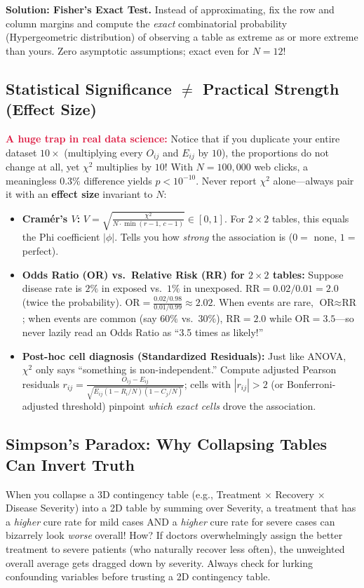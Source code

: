 \documentclass[11pt, a4paper]{article}
\begin{document}
\textbf{Solution: Fisher's Exact Test.} Instead of approximating, fix the row and column margins and compute the \emph{exact} combinatorial probability (Hypergeometric distribution) of observing a table as extreme as or more extreme than yours. Zero asymptotic assumptions; exact even for $N = 12$!

\subsection{Statistical Significance $\neq$ Practical Strength (Effect Size)}
\textcolor{crimson}{\textbf{A huge trap in real data science:}} Notice that if you duplicate your entire dataset $10\times$ (multiplying every $O_{ij}$ and $E_{ij}$ by $10$), the proportions do not change at all, yet $\chi^2$ multiplies by $10$! With $N = 100{,}000$ web clicks, a meaningless $0.3\%$ difference yields $p < 10^{-10}$. Never report $\chi^2$ alone---always pair it with an \textbf{effect size} invariant to $N$:
\begin{itemize}
    \item \textbf{Cramér's $V$:} $V = \sqrt{\frac{\chi^2}{N \cdot \min(r-1,\, c-1)}} \in [0, 1]$. For $2 \times 2$ tables, this equals the Phi coefficient $|\phi|$. Tells you how \emph{strong} the association is ($0 =$ none, $1 =$ perfect).
    \item \textbf{Odds Ratio (OR) vs.\ Relative Risk (RR) for $2 \times 2$ tables:} Suppose disease rate is $2\%$ in exposed vs.\ $1\%$ in unexposed. $\text{RR} = 0.02 / 0.01 = 2.0$ (twice the probability). $\text{OR} = \frac{0.02/0.98}{0.01/0.99} \approx 2.02$. When events are rare, $\text{OR} \approx \text{RR}$; when events are common (say $60\%$ vs.\ $30\%$), $\text{RR} = 2.0$ while $\text{OR} = 3.5$---so never lazily read an Odds Ratio as ``3.5 times as likely!''
    \item \textbf{Post-hoc cell diagnosis (Standardized Residuals):} Just like ANOVA, $\chi^2$ only says ``something is non-independent.'' Compute adjusted Pearson residuals $r_{ij} = \frac{O_{ij} - E_{ij}}{\sqrt{E_{ij}(1 - R_i/N)(1 - C_j/N)}}$; cells with $|r_{ij}| > 2$ (or Bonferroni-adjusted threshold) pinpoint \emph{which exact cells} drove the association.
\end{itemize}

\subsection{Simpson's Paradox: Why Collapsing Tables Can Invert Truth}
When you collapse a 3D contingency table (e.g., Treatment $\times$ Recovery $\times$ Disease Severity) into a 2D table by summing over Severity, a treatment that has a \emph{higher} cure rate for mild cases AND a \emph{higher} cure rate for severe cases can bizarrely look \emph{worse} overall! How? If doctors overwhelmingly assign the better treatment to severe patients (who naturally recover less often), the unweighted overall average gets dragged down by severity. Always check for lurking confounding variables before trusting a 2D contingency table.
\end{document}

